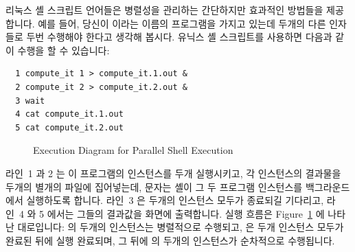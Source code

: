 리눅스 셸 스크립트 언어들은 병렬성을 관리하는 간단하지만 효과적인 방법들을
제공합니다.
예를 들어, 당신이  이라는 이름의 프로그램을 가지고 있는데 두개의
다른 인자들로 두번 수행해야 한다고 생각해 봅시다.
유닉스 셸 스크립트를 사용하면 다음과 같이 수행을 할 수 있습니다:

\vspace{5pt}
\begin{minipage}[t]{\columnwidth}
\scriptsize
\begin{verbatim}
  1 compute_it 1 > compute_it.1.out &
  2 compute_it 2 > compute_it.2.out &
  3 wait
  4 cat compute_it.1.out
  5 cat compute_it.2.out
\end{verbatim}
\end{minipage}
\vspace{5pt}

\begin{figure}[tb]
\centering
{}
\caption{Execution Diagram for Parallel Shell Execution}
\label{fig:intro:Execution Diagram for Parallel Shell Execution}
\end{figure}

라인~1 과 2 는 이 프로그램의 인스턴스를 두개 실행시키고, 각 인스턴스의 결과물을 두개의 별개의 파일에 집어넣는데, \co{&} 문자는 셸이 그 두 프로그램 인스턴스를 백그라운드에서 실행하도록 합니다.
라인~3 은 두개의 인스턴스 모두가 종료되길 기다리고, 라인~4 와 5 에서는 그들의 결과값을 화면에 출력합니다.
실행 흐름은 Figure~\ref{fig:intro:Execution Diagram for Parallel Shell Execution} 에 나타난 대로입니다:
 의 두개의 인스턴스는 병렬적으로 수행되고,  은 두개 인스턴스 모두가 완료된 뒤에 실행 완료되며, 그 뒤에 의 두개의 인스턴스가 순차적으로 수행됩니다.


